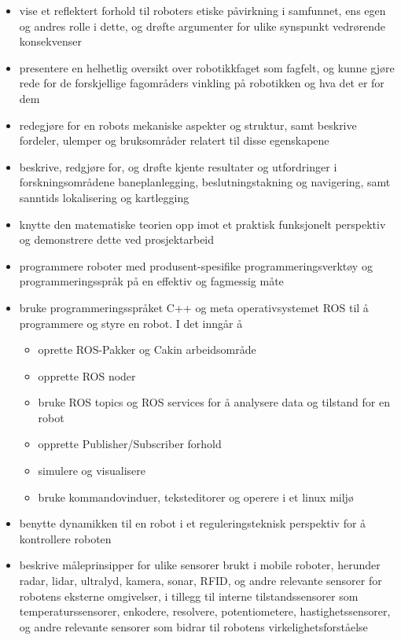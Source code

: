     \begin{itemize}
        \item vise et reflektert forhold til roboters etiske påvirkning i samfunnet, ens egen og andres rolle i dette, og drøfte argumenter for ulike synspunkt vedrørende konsekvenser
        \item presentere en helhetlig oversikt over robotikkfaget som fagfelt, og kunne gjøre rede for de forskjellige fagområders vinkling på robotikken og hva det er for dem
        \item redegjøre for en robots mekaniske aspekter og struktur, samt beskrive fordeler, ulemper og bruksområder relatert til disse egenskapene
        \item beskrive, redgjøre for, og drøfte kjente resultater og utfordringer i forskningsområdene baneplanlegging, beslutningstakning og navigering, samt sanntids lokalisering og kartlegging
        \item knytte den matematiske teorien opp imot et praktisk funksjonelt perspektiv og demonstrere dette ved prosjektarbeid
        \item programmere roboter med produsent-spesifike programmeringsverktøy og programmeringsspråk på en effektiv og fagmessig måte
        \item bruke programmeringsspråket C++ og meta operativsystemet ROS til å programmere og styre en robot. I det inngår å
            \begin{itemize}
                \item oprette ROS-Pakker og Cakin arbeidsområde
                \item opprette ROS noder
                \item bruke ROS topics og ROS services for å analysere data og tilstand for en robot
                \item opprette Publisher/Subscriber forhold
                \item simulere og visualisere
                \item bruke kommandovinduer, teksteditorer og operere i et linux miljø
            \end{itemize}
        \item benytte dynamikken til en robot i et reguleringsteknisk perspektiv for å kontrollere roboten
        \item beskrive måleprinsipper for ulike sensorer brukt i mobile roboter, herunder radar, lidar, ultralyd, kamera, sonar, RFID, og andre relevante sensorer for robotens eksterne omgivelser, i tillegg til interne tilstandssensorer som temperaturssensorer, enkodere, resolvere, potentiometere, hastighetssensorer, og andre relevante sensorer som bidrar til robotens virkelighetsforståelse
    \end{itemize}

